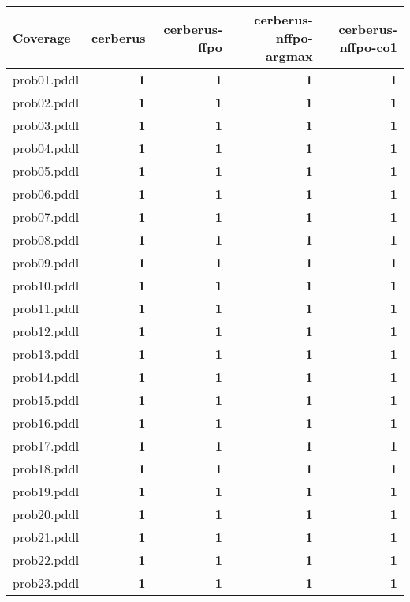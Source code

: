\documentclass{article}
\begin{document}
\begin{tabular}{@{}lrrrr@{}}
Coverage & cerberus & cerberus-ffpo & cerberus-nffpo-argmax & cerberus-nffpo-co1 \\
\midrule
prob01.pddl & \textbf{1} & \textbf{1} & \textbf{1} & \textbf{1} \\
prob02.pddl & \textbf{1} & \textbf{1} & \textbf{1} & \textbf{1} \\
prob03.pddl & \textbf{1} & \textbf{1} & \textbf{1} & \textbf{1} \\
prob04.pddl & \textbf{1} & \textbf{1} & \textbf{1} & \textbf{1} \\
prob05.pddl & \textbf{1} & \textbf{1} & \textbf{1} & \textbf{1} \\
prob06.pddl & \textbf{1} & \textbf{1} & \textbf{1} & \textbf{1} \\
prob07.pddl & \textbf{1} & \textbf{1} & \textbf{1} & \textbf{1} \\
prob08.pddl & \textbf{1} & \textbf{1} & \textbf{1} & \textbf{1} \\
prob09.pddl & \textbf{1} & \textbf{1} & \textbf{1} & \textbf{1} \\
prob10.pddl & \textbf{1} & \textbf{1} & \textbf{1} & \textbf{1} \\
prob11.pddl & \textbf{1} & \textbf{1} & \textbf{1} & \textbf{1} \\
prob12.pddl & \textbf{1} & \textbf{1} & \textbf{1} & \textbf{1} \\
prob13.pddl & \textbf{1} & \textbf{1} & \textbf{1} & \textbf{1} \\
prob14.pddl & \textbf{1} & \textbf{1} & \textbf{1} & \textbf{1} \\
prob15.pddl & \textbf{1} & \textbf{1} & \textbf{1} & \textbf{1} \\
prob16.pddl & \textbf{1} & \textbf{1} & \textbf{1} & \textbf{1} \\
prob17.pddl & \textbf{1} & \textbf{1} & \textbf{1} & \textbf{1} \\
prob18.pddl & \textbf{1} & \textbf{1} & \textbf{1} & \textbf{1} \\
prob19.pddl & \textbf{1} & \textbf{1} & \textbf{1} & \textbf{1} \\
prob20.pddl & \textbf{1} & \textbf{1} & \textbf{1} & \textbf{1} \\
prob21.pddl & \textbf{1} & \textbf{1} & \textbf{1} & \textbf{1} \\
prob22.pddl & \textbf{1} & \textbf{1} & \textbf{1} & \textbf{1} \\
prob23.pddl & \textbf{1} & \textbf{1} & \textbf{1} & \textbf{1} \\

\end{tabular}
\end{document}
